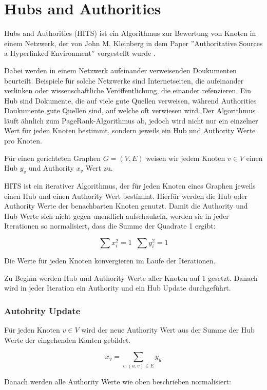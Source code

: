 \section{Hubs and Authorities}

Hubs and Authorities (HITS) ist ein Algorithmus zur Bewertung von Knoten in einem Netzwerk, der von John M. Kleinberg in dem Paper ''Authoritative Sources a Hyperlinked Environment'' vorgestellt wurde \cite{Kleinberg98authoritativesources}.

Dabei werden in einem Netzwerk aufeinander verweisenden Doukumenten beurteilt. Beispiele für solche Netzwerke sind Internetseiten, die aufeinander
verlinken oder wissenschaftliche Veröffentlichung, die einander refenzieren. Ein Hub sind Dokumente, die auf viele gute Quellen verweisen, während
Authorities Doukumente gute Quellen sind, auf welche oft verwiesen wird. Der Algorithmus läuft ähnlich zum PageRank-Algorithmus ab, 
jedoch wird nicht nur ein einzelner Wert für jeden Knoten bestimmt, sondern jeweils ein Hub und Authority Werte pro Knoten.

Für einen gerichteten Graphen $G = (V, E)$ weisen wir jedem Knoten $v \in V$ einen Hub $y_{v}$ und Authority $x_{v}$ Wert zu.

HITS ist ein iterativer Algorithmus, der für jeden Knoten eines Graphen jeweils einen Hub und einen Authority Wert bestimmt. Hierfür 
werden die Hub oder Authority Werte der benachbarten Knoten genutzt. Damit die Authority und Hub Werte sich nicht gegen
unendlich aufschaukeln, werden sie in jeder Iterationen so normalisiert, dass die Summe der Quadrate 1 ergibt:

\[ \sum x_{i}^{2} = 1 \; \; \sum y_{i}^{2} = 1 \]

Die Werte für jeden Knoten konvergieren im Laufe der Iterationen.

Zu Beginn werden Hub und Authority Werte aller Knoten auf 1 gesetzt. Danach wird in jeder Iteration ein Authority und ein Hub Update durchgeführt.
\subsubsection{Autohrity Update}

Für jeden Knoten $ v \in V $ wird der neue Authority Wert aus der Summe der Hub Werte der eingehenden Kanten gebildet.

\[ x_{v} = \sum_{v; (u, v) \in E} y_{u} \]

Danach werden alle Authority Werte wie oben beschrieben normalisiert:

